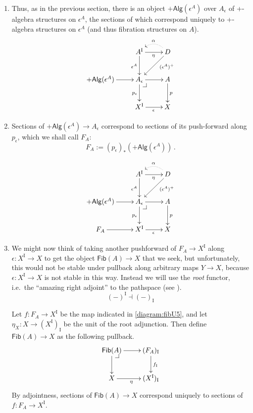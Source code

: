 \documentclass[12pt]{article}
\makeatletter
\newcommand{\pbcorner}[1][dr]{\save*!/#1-1.2pc/#1:(-1,1)@^{|-}\restore}
\newcommand{\ra}{\ensuremath{\rightarrow}}
\newcommand{\I}{\ensuremath{\mathrm{I}}}
\newcommand{\Fib}{\ensuremath{\mathsf{Fib}}}
\theoremstyle{remark}
\theoremstyle{definition}
\makeatother
\begin{document}
\begin{enumerate}
\item Thus, as in the previous section, there is an object $+\mathsf{Alg}(\epsilon^A)$ over  $A_\epsilon$ of +-algebra structures on $\epsilon^A$, the sections of which correspond uniquely to +-algebra structures on $\epsilon^A$ (and thus fibration structures on $A$).
\begin{equation}\label{diagram:fibU4}
\xymatrix{
&A^\I \ar[d]_{\epsilon^A} \ar[r]_\eta & \ar@{.>}@/_1pc/[l]_\alpha D \ar[ld]^<<<<<{(\epsilon^A)^+}  \\
+\mathsf{Alg}(\epsilon^A) \ar[r] & A_\epsilon\ar[d]_{p_\epsilon} \ar[r] \pbcorner & A \ar[d]^{p} \\
& X^\I \ar[r]_{\epsilon} &  X 
}
\end{equation}

\item Sections of $+\mathsf{Alg}(\epsilon^A)\ra A_\epsilon$ correspond to sections of its push-forward along $p_\epsilon$, which we shall call $F_A$: 
\[
F_A := (p_\epsilon)_*(+\mathsf{Alg}(\epsilon^A))\,.
\]

\begin{equation}\label{diagram:fibU5}
\xymatrix{
&A^\I \ar[d]_{\epsilon^A} \ar[r]_\eta & \ar@{.>}@/_1pc/[l]_\alpha D \ar[ld]^<<<<<{(\epsilon^A)^+}  \\
+\mathsf{Alg}(\epsilon^A) \ar[r] & A_\epsilon\ar[d]_{p_\epsilon} \ar[r] \pbcorner & A \ar[d]^{p} \\
F_A \ar[r] & X^\I \ar[r]_{\epsilon} &  X 
}
\end{equation}

\item We might now think of taking another pushforward of $F_A \ra X^\I$ along $\epsilon : X^\I\ra X$ to get the object $\Fib(A) \ra X$ that we seek, but unfortunately, this would not be stable under pullback along arbitrary maps $Y\ra X$, because $\epsilon : X^\I\ra X$ is not stable in this way.  Instead we will use the \emph{root} functor, i.e.\ the ``amazing right adjoint'' to the pathspace  (see \cite{A:cubicalnotes}). $$(-)^\I \dashv (-)_\I$$

Let $f : F_A \ra X^\I$ be the map indicated  in \eqref{diagram:fibU5}, and let $\eta_X : X \ra (X^\I)_\I$ be the unit of the root adjunction.  Then define $\Fib(A)\ra X$ as the following pullback.
\begin{equation}\label{diagram:fibU6}
\xymatrix{
 \Fib(A) \ar[d] \ar[r] \pbcorner & (F_A)_\I \ar[d]^{f_\I}\\
 X \ar[r]_{\eta} &  (X^\I)_\I
}
\end{equation}
By adjointness, sections of $\Fib(A)\ra X$ correspond uniquely to sections of  $f : F_A \ra X^\I$.


\end{enumerate}
\end{document}
